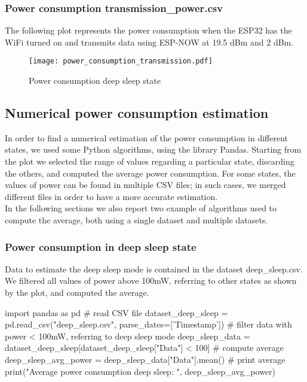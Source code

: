 \subsubsection{Power consumption transmission\_power.csv}
The following plot represents the power consumption when the ESP32 has the WiFi turned on and transmits data using ESP-NOW at 19.5 dBm and 2 dBm.
\begin{figure}[H]
    \centering
    \texttt{[image: power\_consumption\_transmission.pdf]}
    \caption{Power consumption deep sleep state}
    \label{fig:Power consumption deep sleep state}
\end{figure}

\subsection{Numerical power consumption estimation}
In order to find a numerical estimation of the power consumption in different states, we used some Python algorithms, using the library Pandas. Starting from the plot we selected the range of values regarding a particular state, discarding the others, and computed the average power consumption. For some states, the values of power can be found in multiple CSV files; in such cases, we merged different files in order to have a more accurate estimation.\\
In the following sections we also report two example of algorithms used to compute the average, both using a single dataset and multiple datasets.

\subsubsection{Power consumption in deep sleep state}
Data to estimate the deep sleep mode is contained in the dataset deep\_sleep.csv. We filtered all values of power above 100mW, referring to other states as shown by the plot, and computed the average.

\begin{python}
import pandas as pd 
# read CSV file 
dataset_deep_sleep = pd.read_csv("deep_sleep.csv", parse_dates=['Timestamp'])
# filter data with power < 100mW, referring to deep sleep mode
deep_sleep_data = dataset_deep_sleep[dataset_deep_sleep["Data"] < 100]
# compute average
deep_sleep_avg_power = deep_sleep_data["Data"].mean()
# print average 
print("Average power consumption deep sleep: ", deep_sleep_avg_power)
\end{python}

